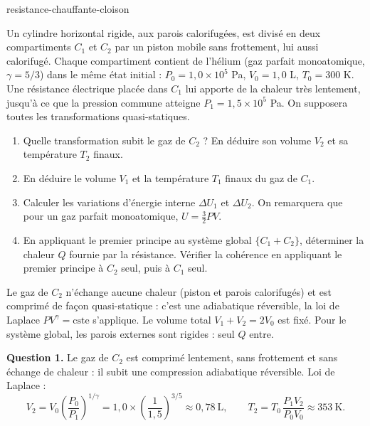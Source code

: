 \begin{exo}{resistance-chauffante-cloison}

Un cylindre horizontal rigide, aux parois calorifugées, est divisé en deux compartiments $C_1$ et $C_2$ par un piston mobile sans frottement, lui aussi calorifugé. Chaque compartiment contient de l'hélium (gaz parfait monoatomique, $\gamma = 5/3$) dans le même état initial : $P_0 = 1{,}0\times10^5$ Pa, $V_0 = 1{,}0$ L, $T_0 = 300$ K. Une résistance électrique placée dans $C_1$ lui apporte de la chaleur très lentement, jusqu'à ce que la pression commune atteigne $P_1 = 1{,}5\times10^5$ Pa. On supposera toutes les transformations quasi-statiques.

\begin{enumerate}
\item Quelle transformation subit le gaz de $C_2$ ? En déduire son volume $V_2$ et sa température $T_2$ finaux.
\item En déduire le volume $V_1$ et la température $T_1$ finaux du gaz de $C_1$.
\item Calculer les variations d'énergie interne $\Delta U_1$ et $\Delta U_2$. On remarquera que pour un gaz parfait monoatomique, $U = \frac{3}{2}PV$.
\item En appliquant le premier principe au système global $\{C_1 + C_2\}$, déterminer la chaleur $Q$ fournie par la résistance. Vérifier la cohérence en appliquant le premier principe à $C_2$ seul, puis à $C_1$ seul.
\end{enumerate}

\begin{indication}
Le gaz de $C_2$ n'échange aucune chaleur (piston et parois calorifugés) et est comprimé de façon quasi-statique : c'est une adiabatique réversible, la loi de Laplace $PV^\gamma = \text{cste}$ s'applique. Le volume total $V_1 + V_2 = 2V_0$ est fixé. Pour le système global, les parois externes sont rigides : seul $Q$ entre.
\end{indication}

\begin{solution}
\textbf{Question 1.} Le gaz de $C_2$ est comprimé lentement, sans frottement et sans échange de chaleur : il subit une compression adiabatique réversible. Loi de Laplace :
\[
V_2 = V_0\!\left(\frac{P_0}{P_1}\right)^{1/\gamma} = 1{,}0\times\left(\frac{1}{1{,}5}\right)^{3/5} \approx 0{,}78\ \text{L},
\qquad
T_2 = T_0\,\frac{P_1V_2}{P_0V_0} \approx 353\ \text{K}.
\]


\end{solution}
\end{exo}
